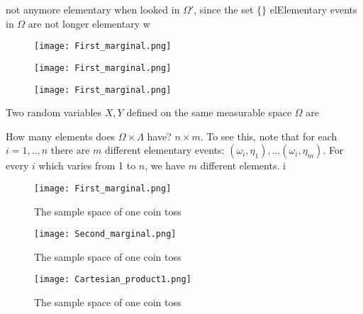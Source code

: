 	not anymore elementary when looked in $\Omega'$, since the set $\{\}$ elElementary events in $\Omega$ are not longer elementary w
	
\begin{figure}[h]
\texttt{[image: First\_marginal.png]}
\label{f:omega}
\end{figure}
\begin{figure}[h]
\texttt{[image: First\_marginal.png]}
\label{f:second}
\end{figure}
\begin{figure}[h]
\texttt{[image: First\_marginal.png]}
\label{f:product}
\end{figure}

	\begin{example}
		\label{ex:joint_sample}
		Two random variables $X,Y$ defined on the same measurable space $\Omega$ are 
	\end{example}

\begin{ExerciseList}

\Exercise How many elements does $\Omega\times \Lambda$ have?
\Answer $n\times m $. To see this, note that for each $i=1,..,n$ there are $m$ different elementary events: $(\omega_i,\eta_1),...(\omega_i,\eta_m)$. For every $i$ which varies from 1 to $n$, we have $m$ different elements.
i
\end{ExerciseList}
	\begin{figure}[h]
		\texttt{[image: First\_marginal.png]}
		\caption{ The sample space of one coin toss \label{f:1marginal}}
	\end{figure}

	
	\begin{figure}[h]
		\texttt{[image: Second\_marginal.png]}
		\caption{ The sample space of one coin toss \label{f:2marginal}}
	\end{figure}

	\begin{figure}[h]
		\texttt{[image: Cartesian\_product1.png]}
		\caption{ The sample space of one coin toss \label{f:cartesian}}
	\end{figure}




